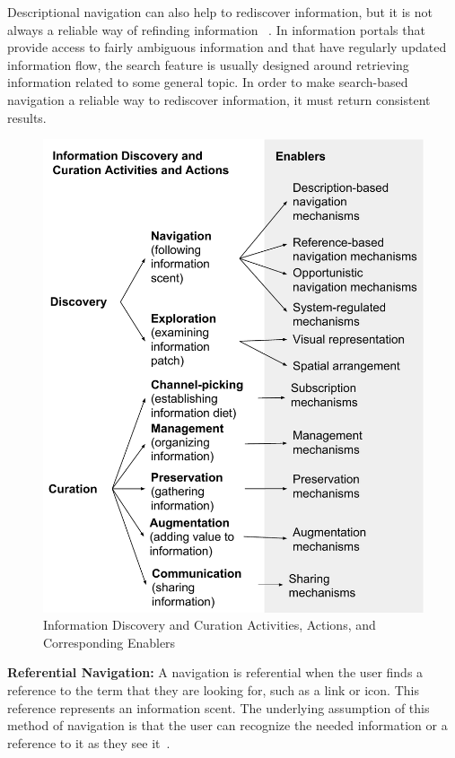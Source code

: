 \documentclass{sigchi}
\begin{document}
{{Descriptional navigation can also help to rediscover information, but it is not always a reliable way of refinding information ~\cite{cockburn2003improving}. In information portals that provide access to fairly ambiguous information and that have regularly updated information flow, the search feature is usually designed around retrieving information related to some general topic. In order to make search-based navigation a reliable way to rediscover information, it must return consistent results. 
} %


\begin{figure}[ht!]
	\noindent
	\centering
    \includegraphics[width=\linewidth]{figures/framework_enablers.pdf}
	\caption{Information Discovery and Curation Activities, Actions, and Corresponding Enablers}
	\label{fig:enablers} 
\end{figure}


\textbf{Referential Navigation:}
A navigation is referential when the user finds a reference to the term that they are looking for, such as a link or icon. This reference represents an information scent. The underlying assumption of this method of navigation is that the user can recognize the needed information or a reference to it as they see it~\cite{waterworth1991model}. 

}
\end{document}
